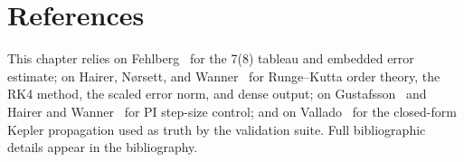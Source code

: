 \section{References}
\label{sec:integrators:references}

This chapter relies on Fehlberg~\cite{fehlberg1968} for the 7(8) tableau
and embedded error estimate; on Hairer, N{\o}rsett, and
Wanner~\cite{hairer1993} for Runge--Kutta order theory, the RK4 method, the
scaled error norm, and dense output; on Gustafsson~\cite{gustafsson1991}
and Hairer and Wanner~\cite{hairer1996} for PI step-size control; and on
Vallado~\cite{vallado2013} for the closed-form Kepler propagation used as
truth by the validation suite. Full bibliographic details appear in the
bibliography.
